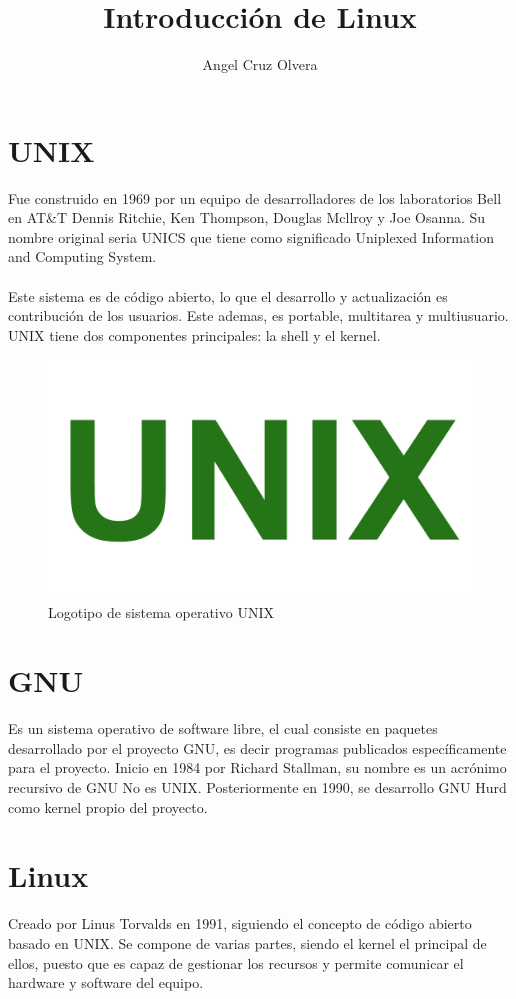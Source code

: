 \documentclass[10pt,a4paper,titlepage]{article}
\title{Introducción de Linux}
\author{Angel Cruz Olvera}
\begin{document}
	\maketitle
	
	\section*{UNIX}	
	Fue construido en 1969 por un equipo de desarrolladores de los laboratorios Bell en AT\&T Dennis Ritchie, Ken Thompson, Douglas Mcllroy y Joe Osanna. Su nombre original seria UNICS que tiene como significado Uniplexed Information and Computing System. 
	\\
	\\
	Este sistema es de código abierto, lo que el desarrollo y actualización es contribución de los usuarios. Este ademas, es portable, multitarea y multiusuario. UNIX tiene dos componentes principales: la shell y el kernel.
	
	\begin{figure}[H]
		\centering
		\includegraphics[width=0.7\linewidth]{"./images/unix.png"}
		\caption{Logotipo de sistema operativo UNIX}
		\label{fig:imagen-de-whatsapp-2025-08-04-a-las-17}
	\end{figure}
	
	
	\section*{GNU}
	Es un sistema operativo de software libre, el cual consiste en paquetes desarrollado por el proyecto GNU, es decir programas publicados específicamente para el proyecto. Inicio en 1984 por Richard Stallman, su nombre es un acrónimo recursivo de GNU No es UNIX. Posteriormente en 1990, se desarrollo GNU Hurd como kernel propio del proyecto.
	
	\section*{Linux}
	Creado por Linus Torvalds en 1991, siguiendo el concepto de código abierto basado en UNIX. Se compone de varias partes, siendo el kernel el principal de ellos, puesto que es capaz de gestionar los recursos y permite comunicar el hardware y software del equipo.
	
\end{document}
